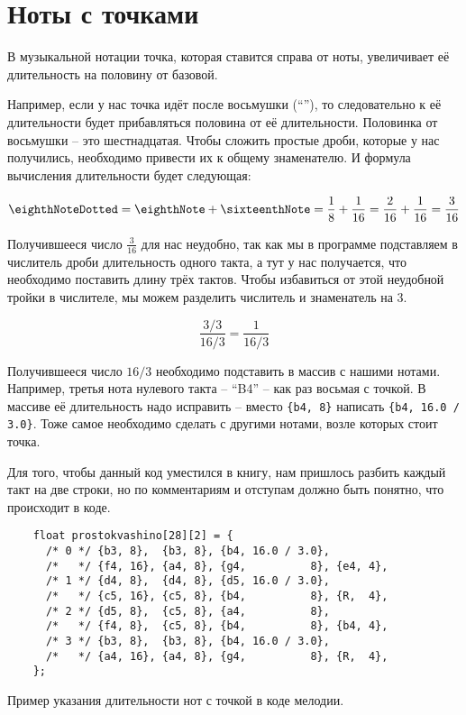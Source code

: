\documentclass[../sparc.tex]{subfiles}
\begin{document}
\section{Ноты с точками}

В музыкальной нотации точка, которая ставится справа от ноты, увеличивает её
длительность на половину от базовой.

Например, если у нас точка идёт после восьмушки (``\eighthNoteDotted''), то
следовательно к её длительности будет прибавляться половина от её длительности.
Половинка от восьмушки -- это шестнадцатая. Чтобы сложить простые дроби, которые
у нас получились, необходимо привести их к общему знаменателю. И формула
вычисления длительности будет следующая:

\begin{equation}
  \mbox{\eighthNoteDotted} = \mbox{\eighthNote} + \mbox{\sixteenthNote}
  = \frac{1}{8} + \frac{1}{16} = \frac{2}{16} + \frac{1}{16} = \frac{3}{16}
\end{equation}

Получившееся число $\frac{3}{16}$ для нас неудобно, так как мы в программе
подставляем в числитель дроби длительность одного такта, а тут у нас получается,
что необходимо поставить длину трёх тактов. Чтобы избавиться от этой неудобной
тройки в числителе, мы можем разделить числитель и знаменатель на 3.

\begin{equation}
  \frac{3 / 3}{16 / 3} = \frac{1}{16 / 3}
\end{equation}

Получившееся число $16 / 3$ необходимо подставить в массив с нашими нотами.
Например, третья нота нулевого такта -- ``B4'' -- как раз восьмая с точкой. В
массиве её длительность надо исправить -- вместо \texttt{\{b4, 8\}} написать
\texttt{\{b4, 16.0 / 3.0\}}. Тоже самое необходимо сделать с другими нотами,
возле которых стоит точка.

Для того, чтобы данный код уместился в книгу, нам пришлось разбить каждый такт
на две строки, но по комментариям и отступам должно быть понятно, что происходит
в коде.

\begin{listing}[ht]
  \begin{verbatim}
    float prostokvashino[28][2] = {
      /* 0 */ {b3, 8},  {b3, 8}, {b4, 16.0 / 3.0},
      /*   */ {f4, 16}, {a4, 8}, {g4,          8}, {e4, 4},
      /* 1 */ {d4, 8},  {d4, 8}, {d5, 16.0 / 3.0},
      /*   */ {c5, 16}, {c5, 8}, {b4,          8}, {R,  4},
      /* 2 */ {d5, 8},  {c5, 8}, {a4,          8},
      /*   */ {f4, 8},  {c5, 8}, {b4,          8}, {b4, 4},
      /* 3 */ {b3, 8},  {b3, 8}, {b4, 16.0 / 3.0},
      /*   */ {a4, 16}, {a4, 8}, {g4,          8}, {R,  4},
    };
  \end{verbatim}
  \label{listing:music-dotted-notes}
  \caption{Пример указания длительности нот с точкой в коде мелодии.}
\end{listing}
\end{document}
